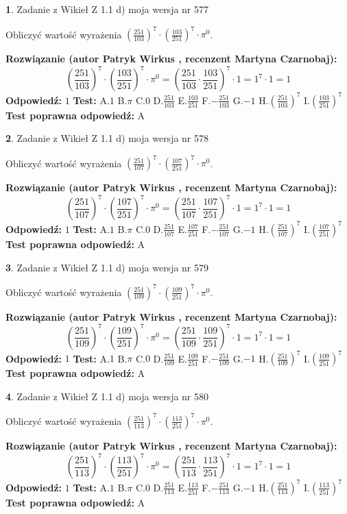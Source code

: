\documentclass[12pt, a4paper]{article}
\theoremstyle{definition} %
\newtheorem{zad}{}
\newcommand{\zadStart}[1]{\begin{zad}#1\newline}
\newcommand{\zadStop}{\end{zad}}
\newcommand{\rozwStart}[2]{\noindent \textbf{Rozwiązanie (autor #1 , recenzent #2): }\newline}
\newcommand{\rozwStop}{\newline}
\newcommand{\odpStart}{\noindent \textbf{Odpowiedź:}\newline}
\newcommand{\odpStop}{\newline}
\newcommand{\testStart}{\noindent \textbf{Test:}\newline}
\newcommand{\testStop}{\newline}
\newcommand{\kluczStart}{\noindent \textbf{Test poprawna odpowiedź:}\newline}
\newcommand{\kluczStop}{\newline}
\begin{document}
\zadStart{Zadanie z Wikieł Z 1.1 d) moja wersja nr 577}

Obliczyć wartość wyrażenia $(\frac{251}{103})^{7} \cdot (\frac{103}{251})^{7} \cdot \pi^{0}$.
\zadStop
\rozwStart{Patryk Wirkus}{Martyna Czarnobaj}
$$(\frac{251}{103})^{7} \cdot (\frac{103}{251})^{7} \cdot \pi^{0} = (\frac{251}{103} \cdot \frac{103}{251})^{7} \cdot 1 = 1^{7} \cdot 1 = 1$$
\rozwStop
\odpStart
$1$
\odpStop
\testStart
A.$1$ B.$\pi$ C.$0$ D.$\frac{251}{103}$ E.$\frac{103}{251}$
F.$-\frac{251}{103}$ G.$-1$
H.$(\frac{251}{103})^{7}$
I.$(\frac{103}{251})^{7}$
\testStop
\kluczStart
A
\kluczStop



\zadStart{Zadanie z Wikieł Z 1.1 d) moja wersja nr 578}

Obliczyć wartość wyrażenia $(\frac{251}{107})^{7} \cdot (\frac{107}{251})^{7} \cdot \pi^{0}$.
\zadStop
\rozwStart{Patryk Wirkus}{Martyna Czarnobaj}
$$(\frac{251}{107})^{7} \cdot (\frac{107}{251})^{7} \cdot \pi^{0} = (\frac{251}{107} \cdot \frac{107}{251})^{7} \cdot 1 = 1^{7} \cdot 1 = 1$$
\rozwStop
\odpStart
$1$
\odpStop
\testStart
A.$1$ B.$\pi$ C.$0$ D.$\frac{251}{107}$ E.$\frac{107}{251}$
F.$-\frac{251}{107}$ G.$-1$
H.$(\frac{251}{107})^{7}$
I.$(\frac{107}{251})^{7}$
\testStop
\kluczStart
A
\kluczStop



\zadStart{Zadanie z Wikieł Z 1.1 d) moja wersja nr 579}

Obliczyć wartość wyrażenia $(\frac{251}{109})^{7} \cdot (\frac{109}{251})^{7} \cdot \pi^{0}$.
\zadStop
\rozwStart{Patryk Wirkus}{Martyna Czarnobaj}
$$(\frac{251}{109})^{7} \cdot (\frac{109}{251})^{7} \cdot \pi^{0} = (\frac{251}{109} \cdot \frac{109}{251})^{7} \cdot 1 = 1^{7} \cdot 1 = 1$$
\rozwStop
\odpStart
$1$
\odpStop
\testStart
A.$1$ B.$\pi$ C.$0$ D.$\frac{251}{109}$ E.$\frac{109}{251}$
F.$-\frac{251}{109}$ G.$-1$
H.$(\frac{251}{109})^{7}$
I.$(\frac{109}{251})^{7}$
\testStop
\kluczStart
A
\kluczStop



\zadStart{Zadanie z Wikieł Z 1.1 d) moja wersja nr 580}

Obliczyć wartość wyrażenia $(\frac{251}{113})^{7} \cdot (\frac{113}{251})^{7} \cdot \pi^{0}$.
\zadStop
\rozwStart{Patryk Wirkus}{Martyna Czarnobaj}
$$(\frac{251}{113})^{7} \cdot (\frac{113}{251})^{7} \cdot \pi^{0} = (\frac{251}{113} \cdot \frac{113}{251})^{7} \cdot 1 = 1^{7} \cdot 1 = 1$$
\rozwStop
\odpStart
$1$
\odpStop
\testStart
A.$1$ B.$\pi$ C.$0$ D.$\frac{251}{113}$ E.$\frac{113}{251}$
F.$-\frac{251}{113}$ G.$-1$
H.$(\frac{251}{113})^{7}$
I.$(\frac{113}{251})^{7}$
\testStop
\kluczStart
A
\kluczStop
\end{document}
